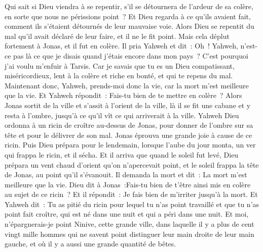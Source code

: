 \begin{multicols}{2}
Qui sait si Dieu viendra à se repentir, s'il se détournera de l'ardeur de sa colère, en sorte que nous ne périssions point~?
Et Dieu regarda à ce qu'ils avaient fait, comment ils s'étaient détournés de leur mauvaise voie. Alors Dieu se repentit du mal qu'il avait déclaré de leur faire, et il ne le fit point.
\VerseOne{}Mais cela déplut fortement à Jonas, et il fut en colère.
Il pria Yahweh et dit~: Oh~! Yahweh, n'est-ce pas là ce que je disais quand j'étais encore dans mon pays~? C'est pourquoi j'ai voulu m'enfuir à Tarsis. Car je savais que tu es un Dieu compatissant, miséricordieux, lent à la colère et riche en bonté, et qui te repens du mal.
Maintenant donc, Yahweh, prends-moi donc la vie, car la mort m'est meilleure que la vie.
Et Yahweh répondit~: Fais-tu bien de te mettre en colère~?
Alors Jonas sortit de la ville et s'assit à l'orient de la ville, là il se fit une cabane et y resta à l'ombre, jusqu'à ce qu'il vît ce qui arriverait à la ville.
Yahweh Dieu ordonna à un ricin de croître au-dessus de Jonas, pour donner de l'ombre sur sa tête et pour le délivrer de son mal. Jonas éprouva une grande joie à cause de ce ricin.
Puis Dieu prépara pour le lendemain, lorsque l'aube du jour monta, un ver qui frappa le ricin, et il sécha.
Et il arriva que quand le soleil fut levé, Dieu prépara un vent chaud d'orient qu'on n'apercevait point, et le soleil frappa la tête de Jonas, au point qu'il s'évanouit. Il demanda la mort et dit~: La mort m'est meilleure que la vie.
Dieu dit à Jonas~:Fais-tu bien de t'être ainsi mis en colère au sujet de ce ricin~? Et il répondit~: Je fais bien de m'irriter jusqu'à la mort.
Et Yahweh dit~: Tu as pitié du ricin pour lequel tu n'as point travaillé et que tu n'as point fait croître, qui est né dans une nuit et qui a péri dans une nuit.
Et moi, n'épargnerais-je point Ninive, cette grande ville, dans laquelle il y a plus de cent vingt mille hommes qui ne savent point distinguer leur main droite de leur main gauche, et où il y a aussi une grande quantité de bêtes.
\PPE{}
\end{multicols}
